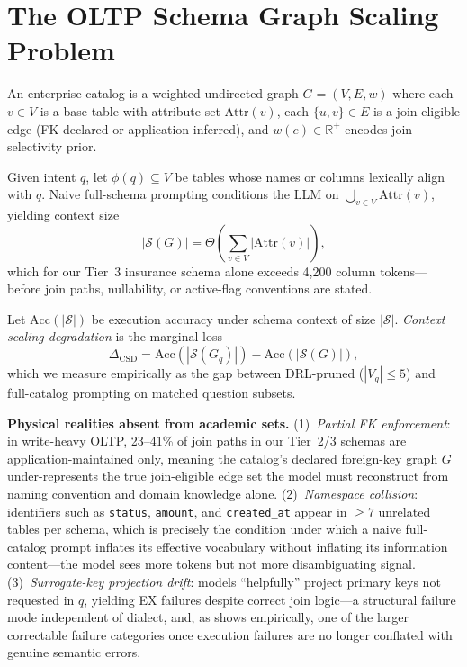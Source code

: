\documentclass[twocolumn]{svjour3}
\begin{document}
\section{The OLTP Schema Graph Scaling Problem}
\label{sec:problem}

\begin{drdef}
\label{def:graph}
An enterprise catalog is a weighted undirected graph $G=(V,E,w)$ where each $v\in V$ is a base table with attribute set $\text{Attr}(v)$, each $\{u,v\}\in E$ is a join-eligible edge (FK-declared or application-inferred), and $w(e)\in\mathbb{R}^+$ encodes join selectivity prior.
\end{drdef}

Given intent $q$, let $\phi(q)\subseteq V$ be tables whose names or columns lexically align with $q$.
Naive full-schema prompting conditions the LLM on $\bigcup_{v\in V}\text{Attr}(v)$, yielding context size
\begin{equation}
  |\mathcal{S}(G)| = \Theta\!\left(\sum_{v\in V} |\text{Attr}(v)|\right),
\end{equation}
which for our Tier~3 insurance schema alone exceeds 4{,}200 column tokens---before join paths, nullability, or active-flag conventions are stated.

\begin{drdef}
\label{def:csd}
Let $\text{Acc}(|\mathcal{S}|)$ be execution accuracy under schema context of size $|\mathcal{S}|$.
\emph{Context scaling degradation} is the marginal loss
\begin{equation}
  \Delta_{\text{CSD}} = \text{Acc}(|\mathcal{S}(G_q)|) - \text{Acc}(|\mathcal{S}(G)|),
\end{equation}
which we measure empirically as the gap between DRL-pruned ($|V_q|\le 5$) and full-catalog prompting on matched question subsets.
\end{drdef}

\textbf{Physical realities absent from academic sets.}
(1)~\emph{Partial FK enforcement}: in write-heavy OLTP, 23--41\% of join paths in our Tier~2/3 schemas are application-maintained only, meaning the catalog's declared foreign-key graph $G$ under-represents the true join-eligible edge set the model must reconstruct from naming convention and domain knowledge alone.
(2)~\emph{Namespace collision}: identifiers such as \texttt{status}, \texttt{amount}, and \texttt{created\_at} appear in $\ge 7$ unrelated tables per schema, which is precisely the condition under which a naive full-catalog prompt inflates its effective vocabulary without inflating its information content---the model sees more tokens but not more disambiguating signal.
(3)~\emph{Surrogate-key projection drift}: models ``helpfully'' project primary keys not requested in $q$, yielding EX failures despite correct join logic---a structural failure mode independent of dialect, and, as  shows empirically, one of the larger correctable failure categories once execution failures are no longer conflated with genuine semantic errors.
\end{document}
